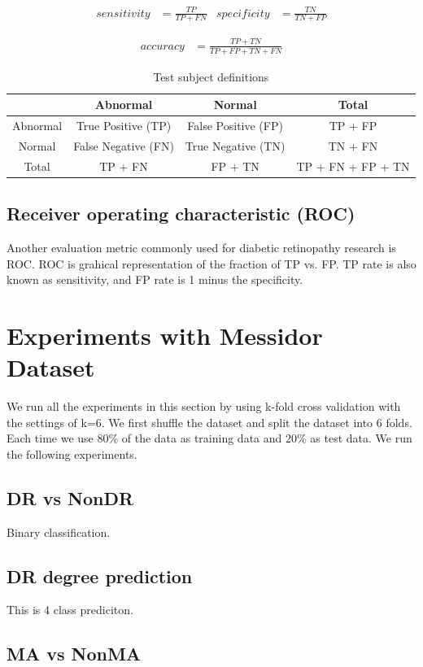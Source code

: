 \begin{align*}
    sensitivity &= \frac{TP}{TP + FN}
    &
    specificity &= \frac{TN}{TN + FP}
\end{align*}

\begin{align*}
    accuracy &= \frac{TP + TN}{TP + FP + TN + FN}
\end{align*}

\begin{table}[t]
\centering
\caption{Test subject definitions} 
\label{tab:configs}
\begin{tabular}{|c|c|c|c|} \hline
     & Abnormal & Normal & Total  \\ \hline
     Abnormal& True Positive (TP) & False Positive (FP) & TP + FP \\ \hline
     Normal & False Negative (FN) & True Negative (TN) & TN + FN \\ \hline
     Total & TP + FN &  FP + TN & TP + FN + FP + TN \\ \hline
\end{tabular}
\end{table}

\subsection{Receiver operating characteristic (ROC)}
Another evaluation metric commonly used for diabetic retinopathy research is ROC. ROC is grahical representation of the fraction of TP  vs. FP. TP rate is also known as sensitivity, and FP rate is 1 minus the specificity. 


\section{Experiments with Messidor Dataset}
We run all the experiments in this section by using k-fold cross validation with the settings of k=6. We first shuffle the dataset and split the dataset into 6 folds. Each time we use 80\% of the data as training data and 20\% as test data. We run the following experiments.
\subsection{DR vs NonDR}
Binary classification.
\subsection{DR degree prediction}
This is 4 class prediciton.
\subsection{MA vs NonMA}
